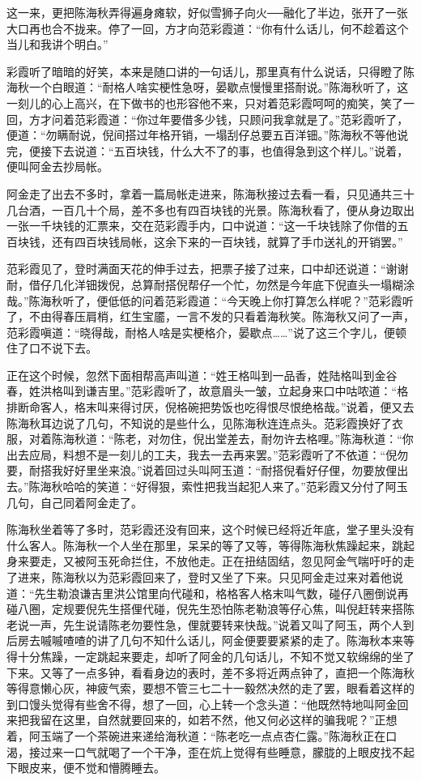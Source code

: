 \documentclass[12pt,UTF8]{ctexbook}
\begin{document}
{{{这一来，更把陈海秋弄得遍身瘫软，好似雪狮子向火──融化了半边，张开了一张大口再也合不拢来。停了一回，方才向范彩霞道：“你有什么话儿，何不趁着这个当儿和我讲个明白。”

彩霞听了暗暗的好笑，本来是随口讲的一句话儿，那里真有什么说话，只得瞪了陈海秋一个白眼道：“耐格人啥实梗性急呀，晏歇点慢慢里搭耐说。”陈海秋听了，这一刻儿的心上高兴，在下做书的也形容他不来，只对着范彩霞呵呵的痴笑，笑了一回，方才问着范彩霞道：“你过年要借多少钱，只顾问我拿就是了。”范彩霞听了，便道：“勿瞒耐说，倪间搭过年格开销，一塌刮仔总要五百洋钿。”陈海秋不等他说完，便接下去说道：“五百块钱，什么大不了的事，也值得急到这个样儿。”说着，便叫阿金去抄局帐。

阿金走了出去不多时，拿着一篇局帐走进来，陈海秋接过去看一看，只见通共三十几台酒，一百几十个局，差不多也有四百块钱的光景。陈海秋看了，便从身边取出一张一千块钱的汇票来，交在范彩霞手内，口中说道：“这一千块钱除了你借的五百块钱，还有四百块钱局帐，这余下来的一百块钱，就算了手巾送礼的开销罢。”

范彩霞见了，登时满面天花的伸手过去，把票子接了过来，口中却还说道：“谢谢耐，借仔几化洋钿拨倪，总算耐搭倪帮仔一个忙，勿然是今年底下倪直头一塌糊涂哉。”陈海秋听了，便低低的问着范彩霞道：“今天晚上你打算怎么样呢？”范彩霞听了，不由得春压肩梢，红生宝靥，一言不发的只看着海秋笑。陈海秋又问了一声，范彩霞嗔道：“晓得哉，耐格人啥是实梗格介，晏歇点……”说了这三个字儿，便顿住了口不说下去。

正在这个时候，忽然下面相帮高声叫道：“姓王格叫到一品香，姓陆格叫到金谷春，姓洪格叫到谦吉里。”范彩霞听了，故意眉头一皱，立起身来口中咕哝道：“格排断命客人，格末叫来得讨厌，倪格碗把势饭也吃得恨尽恨绝格哉。”说着，便又去陈海秋耳边说了几句，不知说的是些什么，见陈海秋连连点头。范彩霞换好了衣服，对着陈海秋道：“陈老，对勿住，倪出堂差去，耐勿许去格哩。”陈海秋道：“你出去应局，料想不是一刻儿的工夫，我去一去再来罢。”范彩霞听了不依道：“倪勿要，耐搭我好好里坐来浪。”说着回过头叫阿玉道：“耐搭倪看好仔俚，勿要放俚出去。”陈海秋哈哈的笑道：“好得狠，索性把我当起犯人来了。”范彩霞又分付了阿玉几句，自己同着阿金走了。

陈海秋坐着等了多时，范彩霞还没有回来，这个时候已经将近年底，堂子里头没有什么客人。陈海秋一个人坐在那里，呆呆的等了又等，等得陈海秋焦躁起来，跳起身来要走，又被阿玉死命拦住，不放他走。正在扭结固结，忽见阿金气喘吁吁的走了进来，陈海秋以为范彩霞回来了，登时又坐了下来。只见阿金走过来对着他说道：“先生勒浪谦吉里洪公馆里向代碰和，格格客人格末叫气数，碰仔八圈倒说再碰八圈，定规要倪先生搭俚代碰，倪先生恐怕陈老勒浪等仔心焦，叫倪赶转来搭陈老说一声，先生说请陈老勿要性急，俚就要转来快哉。”说着又叫了阿玉，两个人到后房去嘁嘁喳喳的讲了几句不知什么话儿，阿金便要要紧紧的走了。陈海秋本来等得十分焦躁，一定跳起来要走，却听了阿金的几句话儿，不知不觉又软绵绵的坐了下来。又等了一点多钟，看看身边的表时，差不多将近两点钟了，直把一个陈海秋等得意懒心灰，神疲气索，要想不管三七二十一毅然决然的走了罢，眼看着这样的到口馒头觉得有些舍不得，想了一回，心上转一个念头道：“他既然特地叫阿金回来把我留在这里，自然就要回来的，如若不然，他又何必这样的骗我呢？”正想着，阿玉端了一个茶碗进来递给海秋道：“陈老吃一点点杏仁露。”陈海秋正在口渴，接过来一口气就喝了一个干净，歪在炕上觉得有些睡意，朦胧的上眼皮找不起下眼皮来，便不觉和懵腾睡去。

}}}
\end{document}
